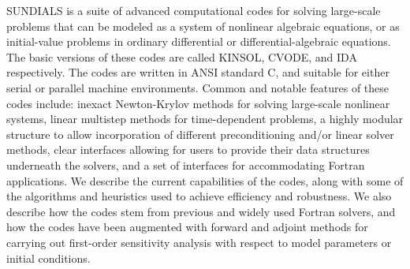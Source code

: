 SUNDIALS is a suite of advanced computational codes for solving
large-scale problems that can be modeled as a system of nonlinear
algebraic equations, or as initial-value problems in ordinary
differential or differential-algebraic equations. The basic versions
of these codes are called KINSOL, CVODE, and IDA respectively. The
codes are written in ANSI standard C, and suitable for either serial
or parallel machine environments.  Common and notable features of
these codes include: inexact Newton-Krylov methods for solving
large-scale nonlinear systems, linear multistep methods for
time-dependent problems, a highly modular structure to allow
incorporation of different preconditioning and/or linear solver
methods, clear interfaces allowing for users to provide their 
data structures underneath the solvers,
and a set of interfaces for accommodating Fortran applications.  We
describe the current capabilities of the codes, along with some of the
algorithms and heuristics used to achieve efficiency and robustness.
We also describe how the codes stem from previous and widely used
Fortran solvers, and how the codes have been augmented with forward
and adjoint methods for carrying out first-order sensitivity analysis
with respect to model parameters or initial conditions.
